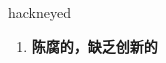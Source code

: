 
\begin{frame}
{\huge hackneyed}
\begin{center}
\begin{enumerate}\Large
  \item \textbf{陈腐的，缺乏创新的}
\end{enumerate}
\end{center}
\end{frame}
